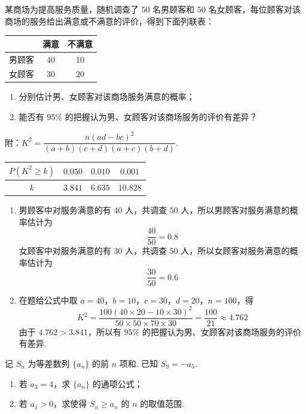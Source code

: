 \begin{problem}
某商场为提高服务质量，随机调查了 \( 50 \) 名男顾客和 \( 50 \) 名女顾客，每位顾客对该商场的服务给出满意或不满意的评价，得到下面列联表：

\begin{center}
\begin{tabular}{c|cc}
 & 满意 & 不满意 \\ \hline
男顾客 & 40 & 10 \\
女顾客 & 30 & 20
\end{tabular}
\end{center}

\begin{enumerate}
\item 分别估计男、女顾客对该商场服务满意的概率；
\item 能否有 \( 95\% \) 的把握认为男、女顾客对该商场服务的评价有差异？
\end{enumerate}

附：\( K^2=\dfrac{n(ad-bc)^2}{(a+b)(c+d)(a+c)(b+d)} \).

\begin{center}
\begin{tabular}{c|ccc}
\( P(K^2\ge k) \) & \( 0.050 \) & \( 0.010 \) & \( 0.001 \) \\ \hline
\( k \) & \( 3.841 \) & \( 6.635 \) & \( 10.828 \)
\end{tabular}
\end{center}
\end{problem}

\begin{solution}
\begin{enumerate}
\item 男顾客中对服务满意的有 \(40\) 人，共调查 \(50\) 人，所以男顾客对服务满意的概率估计为
\[
\frac{40}{50}=0.8
\]
女顾客中对服务满意的有 \(30\) 人，共调查 \(50\) 人，所以女顾客对服务满意的概率估计为
\[
\frac{30}{50}=0.6
\]

\item 在题给公式中取 \(a=40\)，\(b=10\)，\(c=30\)，\(d=20\)，\(n=100\)，得
\[
K^2=\frac{100(40\times20-10\times30)^2}{50\times50\times70\times30}=\frac{100}{21}\approx4.762
\]
由于 \(4.762>3.841\)，所以有 \(95\%\) 的把握认为男、女顾客对该商场服务的评价有差异.
\end{enumerate}
\end{solution}

\begin{problem}
记 \( S_n \) 为等差数列 \( \{a_n\} \) 的前 \( n \) 项和. 已知 \( S_9=-a_5 \).

\begin{enumerate}
\item 若 \( a_3=4 \)，求 \( \{a_n\} \) 的通项公式；
\item 若 \( a_1>0 \)，求使得 \( S_n\ge a_n \) 的 \( n \) 的取值范围.
\end{enumerate}
\end{problem}

